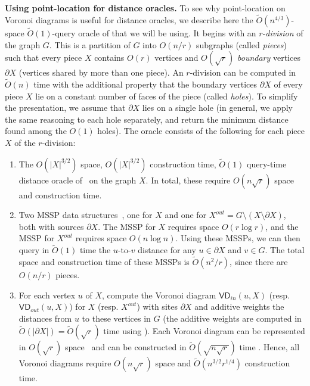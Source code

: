 \documentclass{article}
\newcommand{\out}[1]{#1^{out}}
\newcommand{\VDin}{\textsf{VD}_{in}}
\newcommand{\VDout}{\textsf{VD}_{out}}
\newcommand{\X}{X}
\begin{document}
\medskip
\noindent
{\bf Using point-location for distance oracles.}
To see why point-location on Voronoi diagrams is useful for distance oracles, we describe here the $\tilde O(n^{4/3})$-space $\tilde O(1)$-query oracle of \cite{CharalampopoulosGMW19} that we will be using.
It begins with an $r$-{\em division} of the graph $G$.
This is a partition of $G$ into $O(n/r)$ subgraphs (called {\em pieces}) such that every piece $\X$ contains $O(r)$ vertices and $O(\sqrt{r})$ {\em boundary} vertices $\partial \X$ (vertices shared by more than one piece).
An $r$-division can be computed in $\tilde O(n)$ time \cite{KleinMS13} with the additional property that the boundary vertices $\partial \X$ of every piece $\X$ lie on a constant number of faces of the piece (called {\em holes}).
To simplify the presentation, we assume that $\partial \X$ lies on a single hole (in general, we apply the same reasoning to each hole separately, and return the minimum distance found among the $O(1)$ holes).
The oracle consists of the following for each piece $\X$ of the $r$-division:
\begin{enumerate}
\item The $O(|\X|^{3/2})$ space, $O(|\X|^{3/2})$ construction time, $\tilde O(1)$ query-time distance oracle of~\cite{GawrychowskiMWW18} on the graph $\X$.
In total, these require $O(n\sqrt{r})$ space and construction time.
\item Two MSSP data structures~\cite{Klein02}, one for $\X$ and one for $\out{\X}=G  \setminus  (\X  \setminus  \partial \X)$, both with sources $\partial \X$.
The MSSP for $\X$ requires space $O(r \log r)$, and the MSSP for $\out{\X}$ requires space $O(n \log n)$.
Using these MSSPs, we can then query in $\tilde O(1)$ time the $u$-to-$v$ distance for any $u\in \partial \X$ and $v\in G$.
The total space and construction time of these MSSPs is $\tilde O({n^2}/{r})$, since there are $O(n/r)$ pieces.
\item For each vertex $u$ of $\X$, compute the Voronoi diagram $\VDin(u,\X)$ (resp. $\VDout(u,\X)$) for $\X$ (resp. $\out{\X}$) with sites $\partial \X$ and additive weights the distances from $u$ to these vertices in $G$ (the additive weights are computed in $\tilde O(|\partial \X|) = \tilde O(\sqrt{r})$ time using \cite{FakcharoenpholR06}).
Each Voronoi diagram can be represented in $O(\sqrt{r})$ space~\cite{GawrychowskiMWW18} and can be constructed in $\tilde O(\sqrt{n \sqrt{r}})$ time \cite{CharalampopoulosGMW19}.
Hence, all Voronoi diagrams require $O(n \sqrt{r})$ space and $\tilde O(n^{3/2} r^{1/4})$ construction time.
\end{enumerate}
\end{document}
